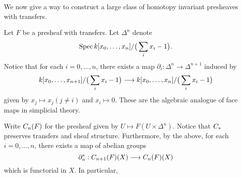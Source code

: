 We now give a way to construct a large class of homotopy invariant
presheaves with transfers.

\begin{constr}\label{constr_suslin_C}
Let $F$ be a presheaf with transfers. Let $\Delta^n$ denote
\[
\Spec \basefield [x_0,\dots,x_n]/\big(\sum_{i} x_i - 1 \big).
\]
Notice that for each $i = 0,..., n$, there exists a map 
$\partial_i : \Delta^n \to \Delta^{n + 1}$ induced by
\[
\basefield [x_0,\dots,x_{n + 1}]/\big(\sum_{i} x_i - 1 \big)
\to \basefield [x_0,\dots,x_n]/\big(\sum_{i} x_i - 1 \big)
\]
given by $x_j \mapsto x_j (j \neq i)$ and $x_i \mapsto 0$. These
are the algebraic analogue of face maps in simplicial theory.

Write $\suslC[n](F)$ for the presheaf given by $U \mapsto
F(U \times \Delta^n)$. Notice that $\suslC$ preserves transfers 
and sheaf structure. Furthermore, by the above, for each $i = 0,
\dots, n$, there exists a map of abelian groups
\[
\partial_n^* : \suslC[n + 1](F)(X) \to \suslC[n](F)(X)
\]
which is functorial in $X$. In particular,
\end{constr}
